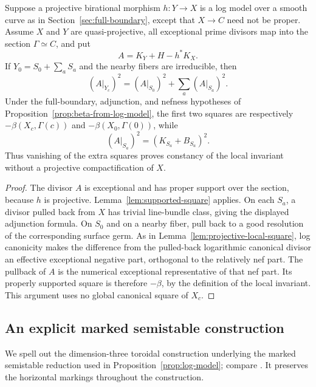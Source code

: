 \begin{corollary}
\label{cor:local-exceptional-square}
Suppose a projective birational morphism $h:Y\to X$ is a log model
over a smooth curve as in Section~\ref{sec:full-boundary}, except
that $X\to C$ need not be proper.  Assume $X$ and $Y$ are
quasi-projective, all exceptional prime divisors map into the section
$\Gamma\simeq C$, and put
\[
 A=K_Y+H-h^*K_X.
\]
If $Y_0=S_0+\sum_aS_a$ and the nearby fibers are irreducible, then
\[
 (A|_{Y_c})^2=(A|_{S_0})^2+\sum_a(A|_{S_a})^2.
\]
Under the full-boundary, adjunction, and nefness hypotheses of
Proposition~\ref{prop:beta-from-log-model}, the first two squares
are respectively $-\beta(X_c,\Gamma(c))$ and
$-\beta(X_0,\Gamma(0))$, while
\[
 (A|_{S_a})^2=(K_{S_a}+B_{S_a})^2.
\]
Thus vanishing of the extra squares proves constancy of the local
invariant without a projective compactification of $X$.
\end{corollary}

\begin{proof}
The divisor $A$ is exceptional and has proper support over the section,
because $h$ is projective.  Lemma~\ref{lem:supported-square} applies.
On each $S_a$, a divisor pulled back from $X$ has trivial line-bundle
class, giving the displayed adjunction formula.  On $S_0$ and on a
nearby fiber, pull back to a good resolution of the corresponding
surface germ.  As in Lemma~\ref{lem:projective-local-square}, log
canonicity makes the difference from the pulled-back logarithmic
canonical divisor an effective exceptional negative part, orthogonal
to the relatively nef part.  The pullback of $A$ is the numerical
exceptional representative of that nef part.  Its properly supported
square is therefore $-\beta$, by the definition of the local invariant.
This argument uses no global canonical square of $X_c$.
\end{proof}

\subsection{An explicit marked semistable construction}

We spell out the dimension-three toroidal construction underlying
the marked semistable reduction used in Proposition~\ref{prop:log-model};
compare \cite[Theorems~7.17 and~7.19]{KM1998}.  It preserves the
horizontal markings throughout the construction.

